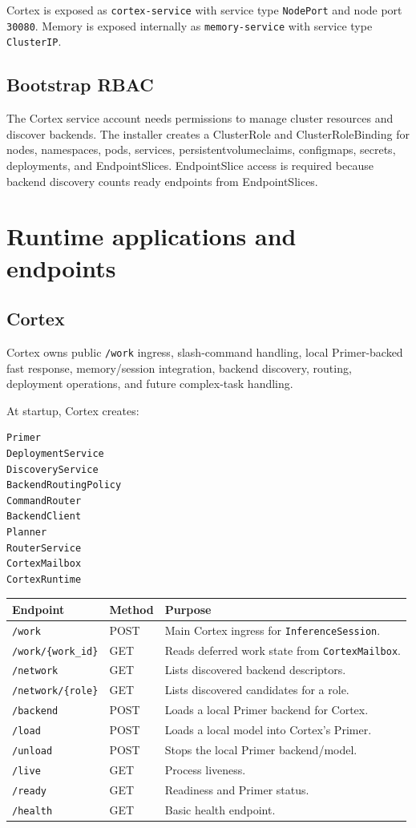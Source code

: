 \documentclass[11pt,a4paper]{article}
\begin{document}
Cortex is exposed as \texttt{cortex-service} with service type \texttt{NodePort} and node port \texttt{30080}. Memory is exposed internally as \texttt{memory-service} with service type \texttt{ClusterIP}.

\subsection{Bootstrap RBAC}
The Cortex service account needs permissions to manage cluster resources and discover backends. The installer creates a ClusterRole and ClusterRoleBinding for nodes, namespaces, pods, services, persistentvolumeclaims, configmaps, secrets, deployments, and EndpointSlices. EndpointSlice access is required because backend discovery counts ready endpoints from EndpointSlices.

\section{Runtime applications and endpoints}
\subsection{Cortex}
Cortex owns public \texttt{/work} ingress, slash-command handling, local Primer-backed fast response, memory/session integration, backend discovery, routing, deployment operations, and future complex-task handling.

At startup, Cortex creates:
\begin{lstlisting}
Primer
DeploymentService
DiscoveryService
BackendRoutingPolicy
CommandRouter
BackendClient
Planner
RouterService
CortexMailbox
CortexRuntime
\end{lstlisting}

\begin{longtable}{@{}p{4cm}p{2cm}p{8cm}@{}}
\toprule
\textbf{Endpoint} & \textbf{Method} & \textbf{Purpose} \\
\midrule
\endhead
\texttt{/work} & POST & Main Cortex ingress for \texttt{InferenceSession}. \\
\texttt{/work/\{work\_id\}} & GET & Reads deferred work state from \texttt{CortexMailbox}. \\
\texttt{/network} & GET & Lists discovered backend descriptors. \\
\texttt{/network/\{role\}} & GET & Lists discovered candidates for a role. \\
\texttt{/backend} & POST & Loads a local Primer backend for Cortex. \\
\texttt{/load} & POST & Loads a local model into Cortex's Primer. \\
\texttt{/unload} & POST & Stops the local Primer backend/model. \\
\texttt{/live} & GET & Process liveness. \\
\texttt{/ready} & GET & Readiness and Primer status. \\
\texttt{/health} & GET & Basic health endpoint. \\
\bottomrule
\end{longtable}
\end{document}
